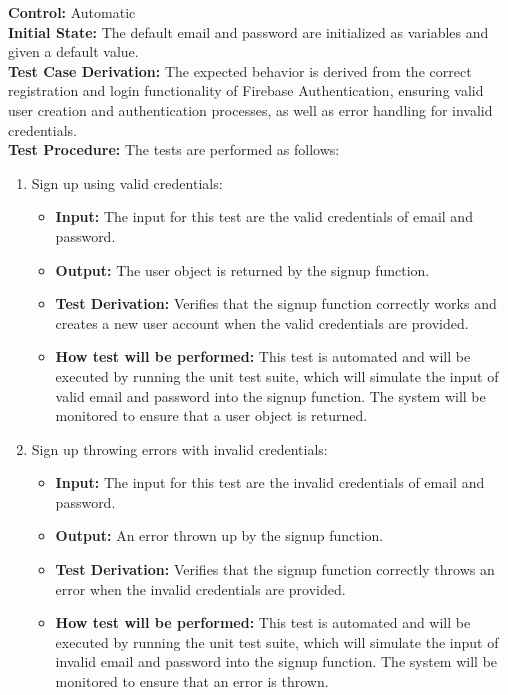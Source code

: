\documentclass[12pt, titlepage]{article}
\begin{document}
\textbf{Control:} Automatic \\ 
\textbf{Initial State:} The default email and password are initialized as variables and given a default value.\\ 
\textbf{Test Case Derivation:} The expected behavior is derived from the correct registration and login functionality of Firebase Authentication, ensuring valid user creation and authentication processes, as well as error handling for invalid credentials.\\ 
\textbf{Test Procedure:} The tests are performed as follows:
\begin{enumerate}
  \item Sign up using valid credentials:
    \begin{itemize}
      \item \textbf{Input:} The input for this test are the valid credentials of email and password.
      \item \textbf{Output:} The user object is returned by the signup function.
      \item \textbf{Test Derivation:} Verifies that the signup function correctly works and creates a new user account when the valid credentials are provided.
      \item \textbf{How test will be performed:} This test is automated and will be executed by running the unit test suite, which will simulate the input of valid email and password into the signup function. The system will be monitored to ensure that a user object is returned.
    \end{itemize}

  \item Sign up throwing errors with invalid credentials:
    \begin{itemize}
      \item \textbf{Input:} The input for this test are the invalid credentials of email and password.
      \item \textbf{Output:} An error thrown up by the signup function.
      \item \textbf{Test Derivation:} Verifies that the signup function correctly throws an error when the invalid credentials are provided.
      \item \textbf{How test will be performed:} This test is automated and will be executed by running the unit test suite, which will simulate the input of invalid email and password into the signup function. The system will be monitored to ensure that an error is thrown.
    \end{itemize}


\end{enumerate}
\end{document}
